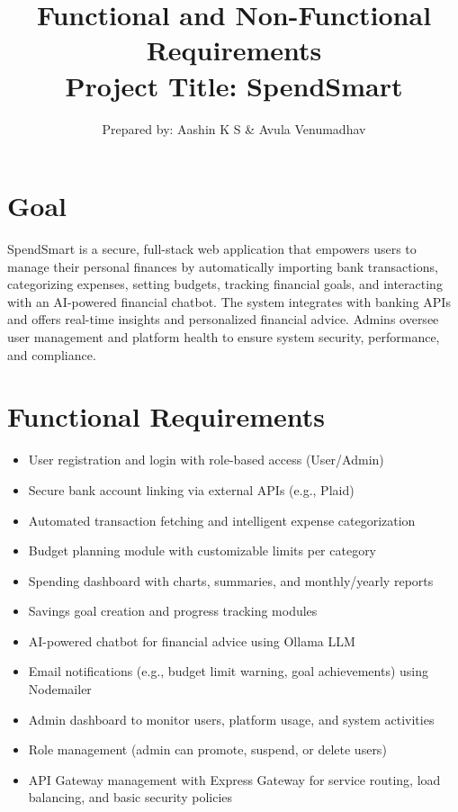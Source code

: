 \documentclass{article}
\title{\textbf{Functional and Non-Functional Requirements}
\vspace{10pt}
\\\large \textbf{Project Title: SpendSmart}}
\author{Prepared by: Aashin K S \& Avula Venumadhav}
\date{}
\begin{document}
\maketitle

\section{Goal}
SpendSmart is a secure, full-stack web application that empowers users to manage their personal finances by automatically importing bank transactions, categorizing expenses, setting budgets, tracking financial goals, and interacting with an AI-powered financial chatbot. The system integrates with banking APIs and offers real-time insights and personalized financial advice. Admins oversee user management and platform health to ensure system security, performance, and compliance.

\section{Functional Requirements}
\begin{itemize}
    \item User registration and login with role-based access (User/Admin)
    \item Secure bank account linking via external APIs (e.g., Plaid)
    \item Automated transaction fetching and intelligent expense categorization
    \item Budget planning module with customizable limits per category
    \item Spending dashboard with charts, summaries, and monthly/yearly reports
    \item Savings goal creation and progress tracking modules
    \item AI-powered chatbot for financial advice using Ollama LLM
    \item Email notifications (e.g., budget limit warning, goal achievements) using Nodemailer
    \item Admin dashboard to monitor users, platform usage, and system activities
    \item Role management (admin can promote, suspend, or delete users)
    \item API Gateway management with Express Gateway for service routing, load balancing, and basic security policies
\end{itemize}
\end{document}

